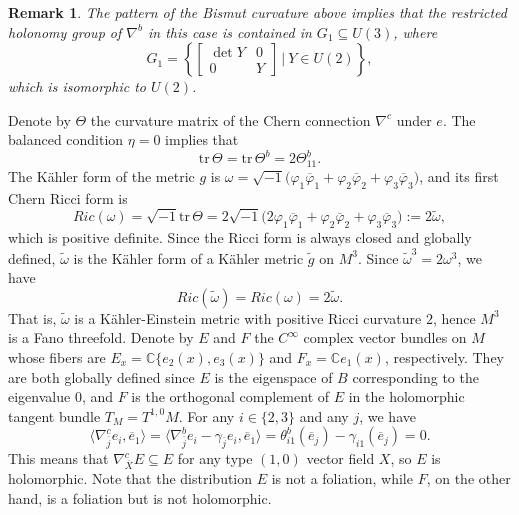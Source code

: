 \documentclass{amsart}
\numberwithin{equation}{section}
\newtheorem{remark}  [theorem]     {Remark}
\theoremstyle{definition}
\renewcommand{\1}{\mathds{1}}
\renewcommand{\>}{\rightarrow}
\begin{document}
\begin{remark} \label{remark7.1}
The pattern of the Bismut curvature above implies that the restricted holonomy group of $\nabla^b$ in this case is contained in $G_1 \subseteq U(3)$, where
$$  G_1 = \left\{ \begin{bmatrix} \det Y & 0 \\ 0 & Y \end{bmatrix} \, \Big| \ Y \in U(2) \right\}, $$
which is isomorphic to $U(2)$.
\end{remark}


Denote by $\Theta$ the curvature matrix of the Chern connection $\nabla^c$ under $e$. The balanced condition $\eta =0$ implies that
$$ \mathrm{tr} \,\Theta = \mathrm{tr}\, \Theta^b = 2\Theta^b_{11} .$$
The K\"ahler form of the metric $g$ is $\omega = \sqrt{-1} \big(  \varphi_1\overline{\varphi}_1 + \varphi_2\overline{\varphi}_2 +\varphi_3\overline{\varphi}_3 \big)$, and its first Chern Ricci form is
\begin{equation} \label{omegatilde}
 Ric(\omega) = \sqrt{-1} \mbox{tr}\,\Theta = 2 \sqrt{-1} \big( 2 \varphi_1\overline{\varphi}_1 + \varphi_2\overline{\varphi}_2 +\varphi_3\overline{\varphi}_3 \big) := 2\tilde{\omega},
 \end{equation}
which is positive definite. Since the Ricci form is always  closed and globally defined, $\tilde{\omega}$ is the K\"ahler form of a K\"ahler metric $\tilde{g}$ on $M^3$. Since $\tilde{\omega}^3=2\omega^3$, we have
\begin{equation} \label{omegatilde2}
 Ric(\tilde{\omega}) = Ric(\omega) = 2\tilde{\omega}.
 \end{equation}
That is,  $\tilde{\omega}$ is a K\"ahler-Einstein metric with positive Ricci curvature $2$, hence $M^3$ is a Fano threefold. Denote by $E$ and $F$ the $C^{\infty}$ complex vector bundles on $M$ whose fibers are  $E_x = {\mathbb C} \{ e_2(x), e_3(x)\}$ and $F_x={\mathbb C}  e_1(x)$, respectively. They are both globally defined since $E$ is the eigenspace of $B$ corresponding to the eigenvalue $0$, and $F$ is the orthogonal complement of $E$ in the holomorphic tangent bundle $T_{\!M}=T^{1,0}M$. For any $i\in \{ 2, 3\}$ and any $j$, we have
$$ \langle \nabla^c_{\overline{j}}e_i , \overline{e}_1 \rangle = \langle \nabla^b_{\overline{j}}e_i - \gamma_{\overline{j}}e_i , \overline{e}_1  \rangle = \theta^b_{i1}(\overline{e}_{j}) -  \gamma_{i1}(\overline{e}_{j}) = 0.$$
This means that $\nabla^c_{\overline{X}}E \subseteq E$ for any type $(1,0)$ vector field $X$, so $E$ is holomorphic.
Note that the distribution $E$ is not a foliation, while $F$, on the other hand, is a foliation but is not holomorphic.
\end{document}
